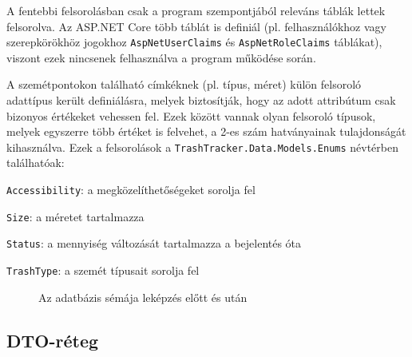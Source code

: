 \begin{note}
	A fentebbi felsorolásban csak a program szempontjából releváns táblák lettek felsorolva. Az ASP.NET Core több táblát is definiál (pl. felhasználókhoz vagy szerepkörökhöz jogokhoz \texttt{AspNetUserClaims} és \texttt{AspNetRoleClaims} táblákat), viszont ezek nincsenek felhasználva a program működése során.
\end{note}
A szemétpontokon található címkéknek (pl. típus, méret) külön felsoroló adattípus került definiálásra, melyek biztosítják, hogy az adott attribútum csak bizonyos értékeket vehessen fel. Ezek között vannak olyan felsoroló típusok, melyek egyszerre több értéket is felvehet, a 2-es szám hatványainak tulajdonságát kihasználva. Ezek a felsorolások a \texttt{TrashTracker.Data.Models.Enums} névtérben találhatóak:
\begin{compactitem}
	\item \texttt{Accessibility}: a megközelíthetőségeket sorolja fel
	\item \texttt{Size}: a méretet tartalmazza
	\item \texttt{Status}: a mennyiség változását tartalmazza a bejelentés óta
	\item \texttt{TrashType}: a szemét típusait sorolja fel
\end{compactitem}

\begin{figure}[H]
	\centering
	\vspace{5pt}
	\caption{Az adatbázis sémája leképzés előtt és után}
	\label{fig:database_scheme}
\end{figure}

\subsection{DTO-réteg}

